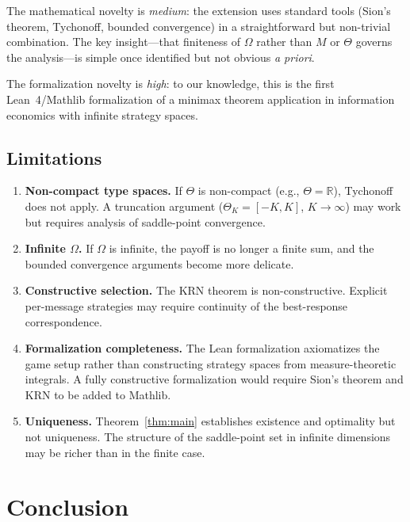 \documentclass[11pt,a4paper]{article}
\theoremstyle{definition}
\newcommand{\R}{\mathbb{R}}
\begin{document}
The mathematical novelty is \emph{medium}: the extension uses standard tools (Sion's theorem, Tychonoff, bounded convergence) in a straightforward but non-trivial combination.
The key insight---that finiteness of $\Omega$ rather than $M$ or $\Theta$ governs the analysis---is simple once identified but not obvious \emph{a priori}.

The formalization novelty is \emph{high}: to our knowledge, this is the first Lean~4/Mathlib formalization of a minimax theorem application in information economics with infinite strategy spaces.

\subsection{Limitations}

\begin{enumerate}[leftmargin=*]
  \item \textbf{Non-compact type spaces.} If $\Theta$ is non-compact (e.g., $\Theta=\R$), Tychonoff does not apply.
  A truncation argument ($\Theta_K=[-K,K]$, $K\to\infty$) may work but requires analysis of saddle-point convergence.

  \item \textbf{Infinite $\Omega$.} If $\Omega$ is infinite, the payoff is no longer a finite sum, and the bounded convergence arguments become more delicate.

  \item \textbf{Constructive selection.} The KRN theorem is non-constructive.
  Explicit per-message strategies may require continuity of the best-response correspondence.

  \item \textbf{Formalization completeness.} The Lean formalization axiomatizes the game setup rather than constructing strategy spaces from measure-theoretic integrals.
  A fully constructive formalization would require Sion's theorem and KRN to be added to Mathlib.

  \item \textbf{Uniqueness.} Theorem~\ref{thm:main} establishes existence and optimality but not uniqueness.
  The structure of the saddle-point set in infinite dimensions may be richer than in the finite case.
\end{enumerate}

\section{Conclusion}
\label{sec:conclusion}
\end{document}
